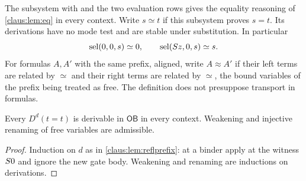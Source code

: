 The subsystem with  and the two evaluation rows gives the
equality reasoning of \cref{claus:lem:eq} in every context. Write $s\simeq t$ if this
subsystem proves $s=t$. Its derivations have no mode test and are stable
under substitution. In particular
\begin{equation}
\label{claus:eq:endpoints}
 \operatorname{sel}(0,0,s)\simeq 0,\qquad \operatorname{sel}(S z,0,s)\simeq s .
\end{equation}
For formulas $A,A'$ with the same prefix, aligned, write $A\approx A'$ if
their left terms are related by $\simeq$ and their right terms are related
by $\simeq$, the bound variables of the prefix being treated as free. The
definition does not presuppose transport in formulas.

\begin{lemma}
\label{claus:lem:deeprefl}
Every $D^d(t=t)$ is derivable in $\mathsf{OB}$ in every context. Weakening
and injective renaming of free variables are admissible.
\end{lemma}
\begin{proof}
Induction on $d$ as in \cref{claus:lem:reflprefix}: at a binder apply
 at the witness $S 0$ and ignore the new gate body.
Weakening and renaming are inductions on derivations.
\end{proof}


